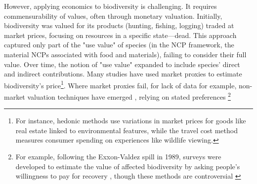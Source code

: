 However, applying economics to biodiversity is challenging. It requires commensurability of values, often through monetary valuation. Initially, biodiversity was valued for its products (hunting, fishing, logging) traded at market prices, focusing on resources in a specific state—dead. This approach captured only part of the "use value" of species \citep{Krutilla1967} (in the NCP framework, the material NCPs associated with food and materials), failing to consider their full value. Over time, the notion of "use value" expanded to include species' direct and indirect contributions. Many studies have used market proxies to estimate biodiversity's price\footnote{For instance, hedonic methods \citep{rosen_hedonic_1974} use variations in market prices for goods like real estate linked to environmental features, while the travel cost method \citep{clawson_economics_1967, bhandari_willingness_2010} measures consumer spending on experiences like wildlife viewing.}. Where market proxies fail, for lack of data for example, non-market valuation techniques have emerged \citep{carson_contingent_2012}, relying on stated preferences \footnote{For example, following the Exxon-Valdez spill in 1989, surveys were developed to estimate the value of affected biodiversity by asking people's willingness to pay for recovery \citep{carson_contingent_1992, arrow_report_1993, carson_contingent_2003}, though these methods are controversial \citep{Diamond94}}
